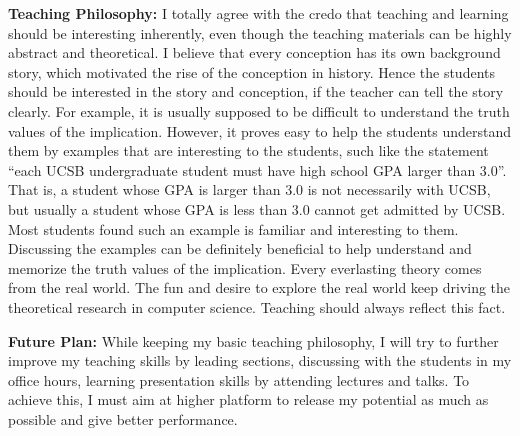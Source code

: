 \documentclass[12pt]{article}
\begin{document}
{\bf Teaching Philosophy:} I totally agree with the credo that teaching and learning should be interesting inherently, even though the teaching materials can be highly abstract and theoretical. I believe that every conception has its own background story, which motivated the rise of the conception in history. Hence the students should be interested in the story and conception, if the teacher can tell the story clearly. For example, it is usually supposed to be difficult to understand the truth values of the implication. However, it proves easy to help the students understand them by examples that are interesting to the students, such like the statement ``each UCSB undergraduate student must have high school GPA larger than 3.0''. That is, a student whose GPA is larger than 3.0 is not necessarily with UCSB, but usually a student whose GPA is less than 3.0 cannot get admitted by UCSB. Most students found such an example is familiar and interesting to them. Discussing the examples can be definitely beneficial to help understand and memorize the truth values of the implication. Every everlasting theory comes from the real world. The fun and desire to explore the real world keep driving the theoretical research in computer science. Teaching should always reflect this fact.

{\bf Future Plan:} While keeping my basic teaching philosophy, I will try to further improve my teaching skills by leading sections, discussing with the students in my office hours, learning presentation skills by attending lectures and talks. To achieve this, I must aim at higher platform to release my potential as much as possible and give better performance.
\end{document}
